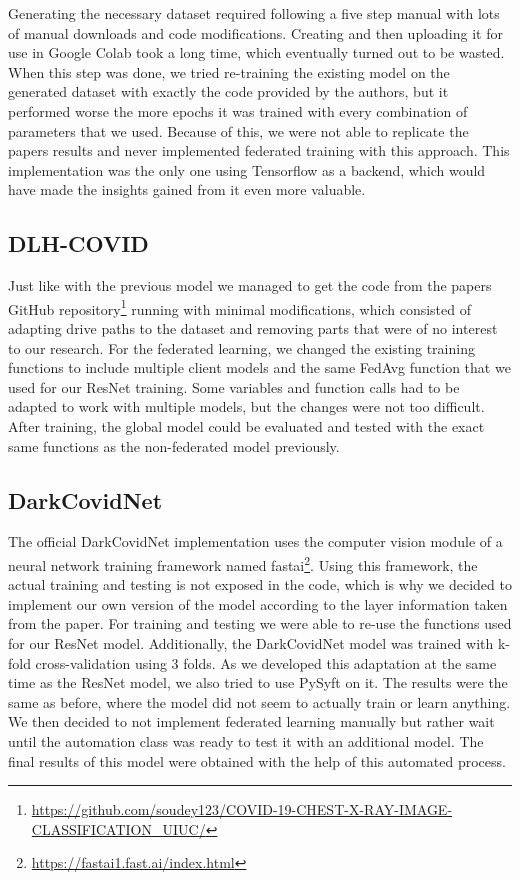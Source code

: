 Generating the necessary dataset required following a five step manual with lots of manual downloads and code modifications. Creating and then uploading it for use in Google Colab took a long time, which eventually turned out to be wasted. When this step was done, we tried re-training the existing model on the generated dataset with exactly the code provided by the authors, but it performed worse the more epochs it was trained with every combination of parameters that we used. Because of this, we were not able to replicate the papers results and never implemented federated training with this approach. This implementation was the only one using Tensorflow as a backend, which would have made the insights gained from it even more valuable.

\subsection{DLH-COVID}
Just like with the previous model we managed to get the code from the papers GitHub repository\footnote{\url{https://github.com/soudey123/COVID-19-CHEST-X-RAY-IMAGE-CLASSIFICATION_UIUC/}} running with minimal modifications, which consisted of adapting drive paths to the dataset and removing parts that were of no interest to our research.
For the federated learning, we changed the existing training functions to include multiple client models and the same FedAvg function that we used for our ResNet training. Some variables and function calls had to be adapted to work with multiple models, but the changes were not too difficult. After training, the global model could be evaluated and tested with the exact same functions as the non-federated model previously.  

\subsection{DarkCovidNet}
The official DarkCovidNet implementation uses the computer vision module of a neural network training framework named fastai\footnote{\url{https://fastai1.fast.ai/index.html}}. Using this framework, the actual training and testing is not exposed in the code, which is why we decided to implement our own version of the model according to the layer information taken from the paper. For training and testing we were able to re-use the functions used for our ResNet model. Additionally, the DarkCovidNet model was trained with k-fold cross-validation using 3 folds.
As we developed this adaptation at the same time as the ResNet model, we also tried to use PySyft on it. The results were the same as before, where the model did not seem to actually train or learn anything.
We then decided to not implement federated learning manually but rather wait until the automation class was ready to test it with an additional model. The final results of this model were obtained with the help of this automated process.

